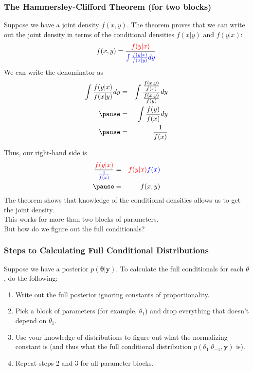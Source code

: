 \documentclass{beamer}
\begin{document}
\begin{frame}
\frametitle{The Hammersley-Clifford Theorem (for two blocks)}
\pause
Suppose we have a joint density $f(x,y)$.  \pause The theorem proves
that we can write out the joint density in terms of the conditional
densities $f(x|y)$ and $f(y|x)$:
\pause
\begin{eqnarray*}
f(x,y) = \frac{\textcolor{red}{f(y|x)}}{\textcolor{blue}{\int \frac{f(y|x)}{f(x|y)} dy}}
\end{eqnarray*}
\pause
We can write the denominator as
\color{blue}
\begin{eqnarray*}
\int \frac{f(y|x)}{f(x|y)} dy &=& \int
\frac{\frac{f(x,y)}{f(x)}}{\frac{f(x,y)}{f(y)}} dy \\
\pause
&=& \int \frac{f(y)}{f(x)} dy\\
\pause
&=& \frac{1}{f(x)}
\end{eqnarray*}
\color{black}
\end{frame}

\begin{frame}
Thus, our right-hand side is
\begin{eqnarray*}
\frac{\red{f(y|x)}}{\blue{\frac{1}{f(x)}}} &=& \red{f(y|x)} \blue{f(x)}\\
\pause
&=& f(x,y)
\end{eqnarray*}
\pause
The theorem shows that knowledge of the conditional densities allows
us to get the joint density.  \\
\pause
\bigskip
This works for more than two blocks of parameters. \\
\pause
\bigskip
But how do we figure out the full conditionals?
\end{frame}

\begin{frame}
\frametitle{Steps to Calculating Full Conditional Distributions}
\pause
Suppose we have a posterior $p(\bm{\theta} | \bm{y})$.  \pause
To calculate the full conditionals for each $\theta$, do the following:
\pause
\bigskip
\begin{enumerate}
\item Write out the full posterior ignoring constants of proportionality.
\pause
\item Pick a block of parameters (for example, $\theta_1$) and drop
everything that doesn't depend on $\theta_1$.
\pause
\item Use your knowledge of distributions to figure out what the
normalizing constant is (and thus what the full
conditional distribution $p(\theta_1 | \theta_{-1}, \bm{y})$ is).
\pause
\item Repeat steps 2 and 3 for all parameter blocks.
\end{enumerate}
\end{frame}
\end{document}
